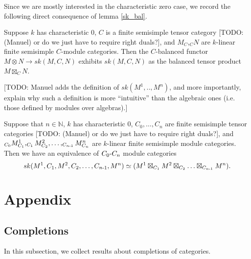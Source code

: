 Since we are mostly interested in the characteristic zero case, we record the following direct consequence of lemma \ref{sk_bal}.

\begin{theorem}
   Suppose $k$ has characteristic $0$, $C$ is a finite semisimple tensor category [TODO: (Manuel) or do we just have to require right duals?], and $M_C$,$_{C}N$ are $k$-linear finite semisimple $C$-module categories. Then the $C$-balanced functor $M\otimes N\to sk(M,C,N)$ exhibits
   $sk(M,C,N)$ as the balanced tensor product $M\boxtimes_C N$.
 \end{theorem}

 [TODO: Manuel adds the definition of $sk(M^{1},..,M^{n})$, and more
 importantly, explain why such a definition is more ``intuitive'' than the
 algebraic ones (i.e. those defined by modules over algebras).]

\begin{corollary}
  Suppose that $n \in \mathbb{N}$, $k$ has characteristic $0$,
  $C_{0}, \ldots, C_{n}$ are finite semisimple tensor categories
  [TODO: (Manuel) or do we just have to require right duals?], and
  $_{C_{0}}M^{1}_{C_{1}}, _{C_{1}}M^{2}_{C_{2}}, \ldots, _{C_{n{\text -}1}}M^{n}_{C_{n}}$
  are $k$-linear finite semisimple module categories. Then we have an
  equivalence of $C_{0}{\text -}C_{n}$ module categories
  \[
    sk(M^{1}, C_{1}, M^{2}, C_{2}, \ldots, C_{n{\text -} 1}, M^{n})
    \simeq
    (M^{1} \boxtimes_{C_{1}} M^{2} \boxtimes_{C_{2}} \ldots \boxtimes_{C_{n{\text -}1}} M^{n}).
  \]
\end{corollary}

\appendix
\section{Appendix}
   
\subsection{Completions}

\noindent In this subsection, we collect results about completions of categories.

